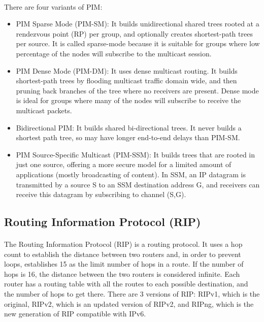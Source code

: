 \documentclass[12pt,a4paper]{report}
\begin{document}
\paragraph{}There are four variants of PIM:
\begin{itemize}
	\item PIM Sparse Mode (PIM-SM): It builds unidirectional shared trees rooted at a rendezvous point (RP) per group, and optionally creates shortest-path trees per source. It is called sparse-mode because it is suitable for groups where low percentage of the nodes will subscribe to the multicast session.
	\item PIM Dense Mode (PIM-DM): It uses dense multicast routing. It builds shortest-path trees by flooding multicast traffic domain wide, and then pruning back branches of the tree where no receivers are present. Dense mode is ideal for groups where many of the nodes will subscribe to receive the multicast packets.
	\item Bidirectional PIM: It builds shared bi-directional trees. It never builds a shortest path tree, so may have longer end-to-end delays than PIM-SM.
	\item PIM Source-Specific Multicast (PIM-SSM): It builds trees that are rooted in just one source, offering a more secure model for a limited amount of applications (mostly broadcasting of content). In SSM, an IP datagram is transmitted by a source S to an SSM destination address G, and receivers can receive this datagram by subscribing to channel (S,G).
\end{itemize}

\subsection{Routing Information Protocol (RIP)}
\paragraph{}The Routing Information Protocol (RIP) is a routing protocol. It uses a hop count to establish the distance between two routers and, in order to prevent loops, establishes 15 as the limit number of hops in a route. If the number of hops is 16, the distance between the two routers is considered infinite. Each router has a routing table with all the routes to each possible destination, and the number of hops to get there. There are 3 versions of RIP: RIPv1, which is the original, RIPv2, which is an updated version of RIPv2, and RIPng, which is the new generation of RIP compatible with IPv6.
\end{document}
